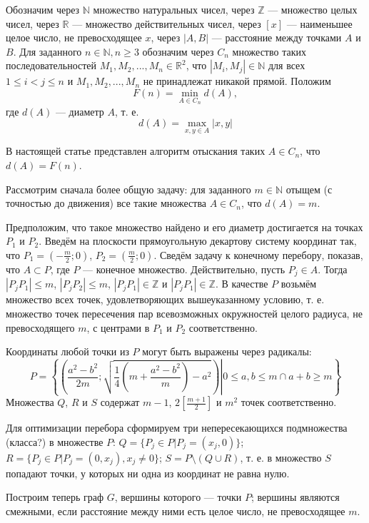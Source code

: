 \documentclass{article}
\begin{document}
Обозначим через $\mathbb{N}$ множество натуральных чисел, через $\mathbb{Z}$ --- множество целых чисел, через $\mathbb{R}$ --- множество действительных чисел, через $[x]$ --- наименьшее целое число, не превосходящее $x$, через $|A,B|$ --- расстояние между точками $A$ и $B$.
Для заданного $n\in \mathbb{N}, n\geq 3$ обозначим через $C_n$ множество таких последовательностей $M_1,M_2,...,M_n \in \mathbb{R}^2$, что $|M_i,M_j|\in\mathbb{N}$ для всех $1\leq i < j  \leq n$ и  $M_1,M_2,...,M_n$ не принадлежат никакой прямой.
Положим
$$
F(n)=\min\limits_{A\in C_n} d(A),
$$
где $d(A)$ --- диаметр $A$, т. е.
$$
d(A)=\max\limits_{x,y\in A}|x,y|
$$

В настоящей статье представлен алгоритм отыскания таких $A \in C_n$, что $d(A) = F(n)$.






Рассмотрим сначала более общую задачу: для заданного $m \in \mathbb{N}$ отыщем (с точностью до движения) все такие множества $A \in C_n$, что $d(A) = m$.

Предположим, что такое множество найдено и его диаметр достигается на точках $P_1$ и $P_2$.
Введём на плоскости прямоугольную декартову систему координат так, что $P_1 = \left(-\frac{m}{2}; 0 \right)$, $P_2 = \left(\frac{m}{2}; 0\right)$.
Сведём задачу к конечному перебору, показав, что $A \subset P$, где $P$ --- конечное множество.
Действительно, пусть $P_{j} \in A$.
Тогда $|P_{j} P_1| \leq m$, $|P_{j} P_2| \leq m$, $|P_{j} P_1| \in \mathbb{Z}$ и $|P_{j} P_1| \in \mathbb{Z}$.
В качестве $P$ возьмём множество всех точек, удовлетворяющих вышеуказанному условию, т. е. множество точек пересечения пар всевозможных окружностей целого радиуса, не превосходящего $m$, с центрами в $P_1$ и $P_2$ соответственно.

Координаты любой точки из $P$ могут быть выражены через радикалы:
$$
	P = \left\{
		\left(\left.  \frac{a^2-b^2}{2m} ; \sqrt{ \frac{1}{4} \left(m+\frac{a^2-b^2}{m} \right) - a^2 }  \right)	\right| 0 \leq a, b \leq m \cap a+b \geq m
	\right\}
$$
Множества $Q$, $R$ и $S$ содержат $m-1$, $2\left\lbrack\frac{m+1}{2}\right\rbrack$ и $m^2$ точек соответственно.


Для оптимизации перебора сформируем три непересекающихся подмножества (класса?) в множестве $P$:
$Q = \{P_j \in P | P_j = (x_j, 0)\}$;
$R = \{P_j \in P | P_j = (0, x_j), x_j \neq 0\}$;
$S = P \setminus \left( Q \cup R\right)$,
т. е. в множество $S$ попадают точки, у которых ни одна из координат не равна нулю.

Построим теперь граф $G$, вершины которого --- точки $P$;
вершины являются смежными, если расстояние между ними есть целое число, не превосходящее $m$.
\end{document}
